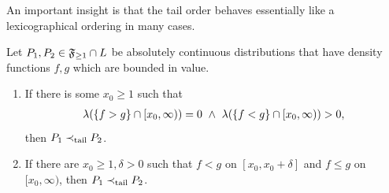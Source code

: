 \documentclass[a4paper]{scrreprt}
\begin{document}
    An important insight is that the tail order behaves essentially like a lexicographical ordering in many cases.
    \begin{thm}
        Let $P_1, P_2 \in \mathfrak{F}_{\geq 1} \cap L$ be absolutely continuous distributions that have density functions $f, g$ which are bounded in value.
        \begin{enumerate}
            \item 
            If there is some $x_0 \geq 1$ such that 
            \begin{gather*}
                \lambda(\{f > g\} \cap [x_0, \infty)) = 0 ~\wedge~ \lambda(\{f < g\} \cap [x_0, \infty)) > 0,
            \end{gather*}
            then $P_1 \prec_{\text{tail}} P_2$.
            \label{item:acTailOrder-NonNullDominatingSetSuffCondition}
            
            \item 
            If there are $x_0 \geq 1, \delta > 0$ such that $f < g$ on $[x_0, x_0 + \delta]$ and $f \leq g$ on $[x_0, \infty)$, then $P_1 \prec_{\text{tail}} P_2$.
            \label{item:acTailOrder-DominatingIntervalSuffCondition}
        \end{enumerate}
        \label{thm:acTailOrderSuffConditions}
    \end{thm}
\end{document}
